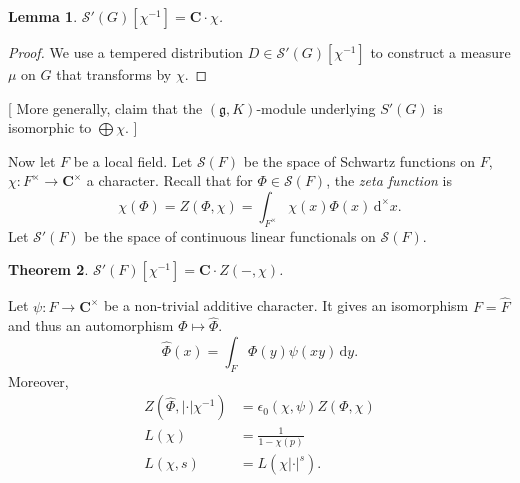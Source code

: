 \documentclass{article}
\newcommand{\bC}{\mathbf{C}}
\newcommand{\cS}{\mathcal{S}}
\newcommand{\dd}{\mathrm{d}}
\newtheorem{theorem}{Theorem}
\newtheorem{lemma}[theorem]{Lemma}
\numberwithin{theorem}{section}
\begin{document}
\begin{lemma}
$\cS'(G)[\chi^{-1}] = \bC\cdot \chi$. 
\end{lemma}
\begin{proof}
We use a tempered distribution $D\in \cS'(G)[\chi^{-1}]$ to construct a 
measure $\mu$ on $G$ that transforms by $\chi$. 
\end{proof}

[
More generally, claim that the $(\mathfrak{g},K)$-module underlying $S'(G)$ is 
isomorphic to $\bigoplus \chi$. 
]

Now let $F$ be a local field. Let $\cS(F)$ be the space of Schwartz functions 
on $F$, $\chi\colon F^\times \to\bC^\times$ a character. Recall that for 
$\Phi\in \cS(F)$, the \emph{zeta function} is 
\[
	\chi(\Phi) = Z(\Phi,\chi) = \int_{F^\times} \chi(x) \Phi(x) \, \dd^\times x .
\]
Let $\cS'(F)$ be the space of continuous linear functionals on $\cS(F)$. 

\begin{theorem}
$\cS'(F)[\chi^{-1}] = \bC\cdot Z(-,\chi)$. 
\end{theorem}

Let $\psi\colon F\to \bC^\times$ be a non-trivial additive character. It gives 
an isomorphism $F = \widehat F$ and thus an automorphism 
$\Phi\mapsto \hat\Phi$. 
\[
	\hat\Phi(x) = \int_F \Phi(y) \psi(xy)\, \dd y .
\]
Moreover, 
\begin{align*}
	Z(\hat\Phi,|\cdot|\chi^{-1}) &= \epsilon_0(\chi,\psi) Z(\Phi,\chi) \\
	L(\chi) &= \frac{1}{1-\chi(p)} \\
	L(\chi,s) &= L(\chi |\cdot|^s) .
\end{align*}






\printbibliography
\end{document}
